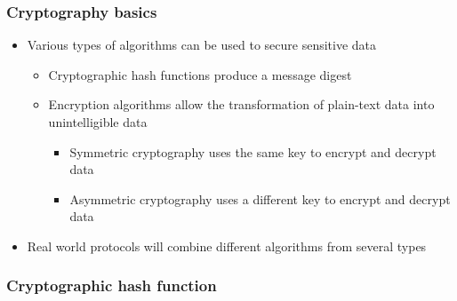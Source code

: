 \begin{frame}
  \frametitle{Cryptography basics}
  \begin{itemize}
    \item Various types of algorithms can be used to secure sensitive data
      \begin{itemize}
        \item Cryptographic hash functions produce a message digest
        \item Encryption algorithms allow the transformation of plain-text data into
          unintelligible data
          \begin{itemize}
            \item Symmetric cryptography uses the same key to encrypt and decrypt data
            \item Asymmetric cryptography uses a different key to encrypt and decrypt data
          \end{itemize}
      \end{itemize}
    \item Real world protocols will combine different algorithms from several
      types
  \end{itemize}
\end{frame}

\subsubsection{Cryptographic hash function}


